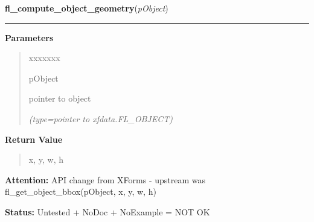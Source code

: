 \hspace{.8\funcindent}\begin{boxedminipage}{\funcwidth}

    \raggedright \textbf{fl\_compute\_object\_geometry}(\textit{pObject})

    \vspace{-1.5ex}

    \rule{\textwidth}{0.5\fboxrule}
\setlength{\parskip}{2ex}
\setlength{\parskip}{1ex}
      \textbf{Parameters}
      \vspace{-1ex}

      \begin{quote}
        \begin{Ventry}{xxxxxxx}

          \item[pObject]

          pointer to object

            {\it (type=pointer to xfdata.FL\_OBJECT)}

        \end{Ventry}

      \end{quote}

      \textbf{Return Value}
    \vspace{-1ex}

      \begin{quote}
      x, y, w, h

      \end{quote}

\textbf{Attention:} API change from XForms - upstream was fl\_get\_object\_bbox(pObject, x, y, 
w, h)



\textbf{Status:} Untested + NoDoc + NoExample = NOT OK



    \end{boxedminipage}

    \label{xformslib:library:fl_call_object_callback}

    \vspace{0.5ex}

